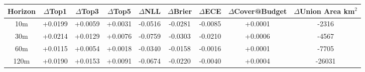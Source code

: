 \begin{tabular}{ccccccccc}
\toprule
Horizon & $\Delta$Top1 & $\Delta$Top3 & $\Delta$Top5 & $\Delta$NLL & $\Delta$Brier & $\Delta$ECE & $\Delta$Cover@Budget & $\Delta$Union Area km$^2$ \\
\midrule
10m & +0.0199 & +0.0059 & +0.0031 & -0.0516 & -0.0281 & -0.0085 & +0.0001 & -2316 \\
30m & +0.0214 & +0.0129 & +0.0076 & -0.0759 & -0.0303 & -0.0210 & +0.0006 & -4567 \\
60m & +0.0115 & +0.0054 & +0.0018 & -0.0340 & -0.0158 & -0.0016 & +0.0001 & -7705 \\
120m & +0.0190 & +0.0153 & +0.0091 & -0.0674 & -0.0220 & -0.0040 & +0.0004 & -26031 \\
\bottomrule
\end{tabular}
